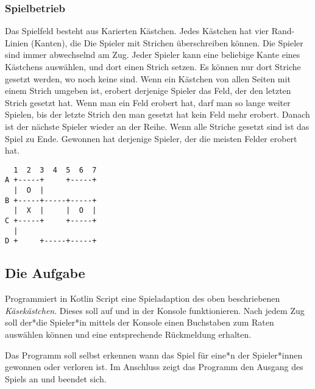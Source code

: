 \subsubsection*{Spielbetrieb}
\begin{minipage}[t]{.7\textwidth}
    Das Spielfeld besteht aus Karierten Kästchen. Jedes Kästchen hat vier Rand-Linien (Kanten), die Die Spieler mit Strichen überschreiben können.
    Die Spieler sind immer abwechselnd am Zug. Jeder Spieler kann eine beliebige Kante eines Kästchens auswählen, und dort einen Strich setzen. Es können nur dort Striche gesetzt werden, wo noch keine sind. Wenn ein Kästchen von allen Seiten mit einem Strich umgeben ist, erobert derjenige Spieler das Feld, der den letzten Strich gesetzt hat. Wenn man ein Feld erobert hat, darf man so lange weiter Spielen, bis der letzte Strich den man gesetzt hat kein Feld mehr erobert. Danach ist der nächste Spieler wieder an der Reihe.
    Wenn alle Striche gesetzt sind ist das Spiel zu Ende. Gewonnen hat derjenige Spieler, der die meisten Felder erobert hat.
\end{minipage}%
\begin{minipage}[t]{.3\textwidth}%
    \centering%
    \captionsetup{type=figure}
    \begin{BVerbatim}
  1  2  3  4  5  6  7
A +-----+     +-----+
  |  O  |
B +-----+-----+-----+
  |  X  |     |  O  |
C +-----+     +-----+
  |
D +     +-----+-----+
    \end{BVerbatim}
\end{minipage}%

\subsection*{Die Aufgabe}
Programmiert in Kotlin Script eine Spieladaption des oben beschriebenen \emph{Käsekästchen}.
Dieses soll auf und in der Konsole funktionieren.
Nach jedem Zug soll der*die Spieler*in mittels der Konsole einen Buchstaben zum Raten auswählen können und eine entsprechende Rückmeldung erhalten.

Das Programm soll selbst erkennen wann das Spiel für eine*n der Spieler*innen gewonnen oder verloren ist.
Im Anschluss zeigt das Programm den Ausgang des Spiels an und beendet sich.


